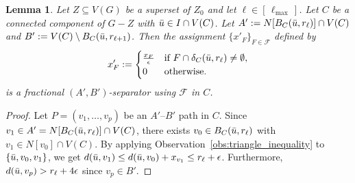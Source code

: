 \documentclass[11pt]{amsart}
\newtheorem{lemma}[theorem]{Lemma}
\begin{document}
 
\begin{lemma}\label{lem:good_layer_frac_separator}
    Let $Z \subseteq V(G)$ be a superset of $Z_0$ and let $\ell \in [\,\ell_{\max}\,]$. Let $C$ be a connected component of $G - Z$ with $\Bar{u} \in I \cap V(C)$. Let $A' := N[B_C(\Bar{u}, r_\ell)]\cap V(C)$ and $B' := V(C) \setminus B_C(\Bar{u}, r_{\ell+1})$. Then the assignment $\{x'_F\}_{F \in \mathcal{F}}$ defined by
    $$
    x'_F :=
    \begin{cases}
    \frac{x_F}{\epsilon} & \text{if } F \cap \delta_C(\Bar{u}, r_\ell) \neq \emptyset, \\
    0 & \text{otherwise.}
    \end{cases}
    $$
    is a fractional $(A', B')$-separator using $\mathcal{F}$ in $C$.
\end{lemma}
\begin{proof}

    Let $P = (v_1, \dots, v_p)$ be an $A'$--$B'$ path in $C$. Since $v_1\in A' = N[B_C(\Bar{u}, r_\ell)]\cap V(C)$, there exists $v_0\in B_C(\Bar{u}, r_\ell)$ with $v_1\in N[v_0]\cap V(C)$. By applying Observation~\ref{obs:triangle_inequality} to $\{\Bar{u},v_0,v_1\}$, we get $d(\Bar{u}, v_1) \leq d(\Bar{u}, v_0) + x_{v_1} \leq r_\ell + \epsilon$. Furthermore, $d(\Bar{u}, v_p) > r_\ell + 4\epsilon$ since $v_p\in B'$. 
    

\end{proof}
\end{document}
